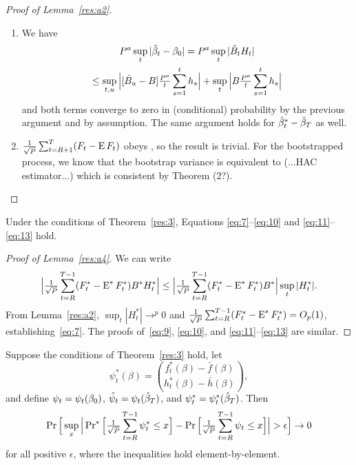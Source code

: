 \documentclass[12pt,fleqn]{article}
\begin{document}
\begin{proof}[Proof of Lemma~\ref{res:a2}]
\begin{enumerate}
    Since
    \[
    \omax{t} \Big|\sum_{s=K_{j^*_t - 1}+1}^t h_s^*/t \Big| \leq \sum_{i=1}^{J} \max_{t = K_{i-1}+1,\dots,K_i} \Big| \sum_{s=K_{i-1}+1}^t h_s^*/t \Big|
    \]
    the proof that the second component converges to zero is similar.
  \item We have
    \begin{multline}
      P^a \sup_t | \hat{\beta}_t - \btrue | = P^a \sup_t |\hat{B}_{t}
      H_{t}| \\ \leq \sup_{t,u} \Big| [ \hat{B}_u - B]
      \tfrac{P^a}{t} \sum_{s=1}^t h_{s} \Big| + \sup_{t} \Big|
      B \tfrac{P^a}{t} \sum_{s=1}^t h_{s} \Big|
    \end{multline}
    and both terms converge to zero in (conditional) probability by
    the previous argument and by assumption.  The same argument holds
    for $\hat{\beta}_t^{*} - \btrue[*]$ as well.
  \item $\tfrac{1}{\sqrt{P}} \sum_{t=R+1}^T (F_t - \E F_t)$ obeys
     \clt, so the result is trivial. For the
    bootstrapped process, we know that the bootstrap variance is
    equivalent to (...HAC estimator...) which is consistent by
     Theorem (2?).\qedhere
  \end{enumerate}
\end{proof}

\begin{lema}\label{res:a4}
  Under the conditions of Theorem~\ref{res:3}, Equations
  \eqref{eq:7}--\eqref{eq:10} and \eqref{eq:11}--\eqref{eq:13} hold.
\end{lema}

\begin{proof}[Proof of Lemma~\ref{res:a4}]
We can write
\begin{equation*}
  \Big\lvert \WesA[*] \Big\rvert \leq
  \Big\lvert \oclt{t} (F_t^* - \E^* F^*_t) B^* \Big\rvert
  \sup_t | H_t^* |.
\end{equation*}
From Lemma~\ref{res:a2}, $\sup_t | H_t^* | \to^p 0$ and $\oclt{t}
(F_t^* - \E^* F_t^*) = O_p(1)$, establishing~\eqref{eq:7}.  The proofs
of~\eqref{eq:9}, \eqref{eq:10}, and \eqref{eq:11}--\eqref{eq:13} are
similar.
\end{proof}

\begin{lema}\label{res:a3}
  Suppose the conditions of Theorem~\ref{res:3} hold, let
  \[\psi_t^{*}(\beta) =
  \binom{f_t^{*}(\beta) - \bar{f}(\beta)}{h_t^{*}(\beta) - \bar h(\beta)},\]
  and define $\psi_t = \psi_t(\btrue)$, $\hat\psi_t = \psi_t(\btrue[*])$, and
  $\psi_t^* = \psi_t^*(\btrue[*])$.  Then
  \begin{equation}\label{eq:1}
    \pr\Big[\sup_x \Big| \pr^{*}\Big[ \oclt{t} \psi_{t}^{*}
    \leq x \Big] - \pr\Big[ \oclt{t} \psi_{t}
    \leq x \Big] \Big| > \epsilon \Big] \to 0
  \end{equation}
  for all positive $\epsilon$, where the inequalities hold element-by-element.
\end{lema}
\end{document}
